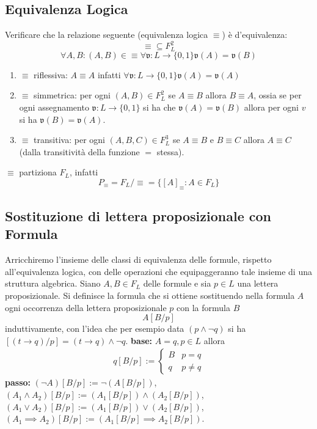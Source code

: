 \subsection{Equivalenza Logica}
Verificare che la relazione seguente (equivalenza logica $\equiv$) è d'equivalenza: 
$$ 
\equiv \subseteq F_L^2
$$
$$
\forall A,B: (A,B) \in \equiv \forall \mathfrak{v}:L\rightarrow \{0,1\} \mathfrak{v}(A) = \mathfrak{v}(B)
$$
\begin{enumerate}
  \item $\equiv$ riflessiva: $A \equiv A$ infatti $\forall \mathfrak{v}:L \rightarrow \{0,1\} \mathfrak{v}(A) = \mathfrak{v}(A)$
  \item $\equiv$ simmetrica: per ogni $(A,B) \in F_L^2$ se $A \equiv B$ allora
    $B \equiv A$, ossia se per ogni assegnamento $\mathfrak{v}:L \rightarrow \{0,1\}$ si 
    ha che $\mathfrak{v}(A) = \mathfrak{v}(B)$ allora per ogni $v$ si ha $\mathfrak{v}(B) = \mathfrak{v}(A)$. 
  \item $\equiv$ transitiva: per ogni $(A,B,C) \in F_L^3$ se $A \equiv B$ e 
    $B \equiv C$ allora $A \equiv C$ (dalla transitività della funzione 
    $=$ stessa). 
\end{enumerate}

$\equiv$ partiziona $F_L$, infatti 
$$
P_{\equiv} = F_L/\equiv =  \{ [A]_{\equiv} : A \in F_L\}
$$
\noindent 
\subsection{Sostituzione di lettera proposizionale con Formula}
Arricchiremo l'insieme delle classi di equivalenza delle formule, rispetto 
all'equivalenza logica, con delle operazioni che equipaggeranno tale insieme 
di una struttura algebrica.
Siano $A, B \in F_L$ delle formule e sia $p \in L$ una lettera proposizionale. 
Si definisce la formula che si ottiene sostituendo nella formula $A$ ogni 
occorrenza della lettera proposizionale $p$ con la formula $B$
$$
A[B/p]
$$
induttivamente, con l'idea che per esempio data $(p \land \neg q)$ si ha 
$[(t \rightarrow q)/p] = (t\rightarrow q) \land \neg q$. 
\newline
\textbf{base:} $A = q, p \in L$  allora 
\begin{align*}
  q[B/p] := 
  \begin{cases}
    B & p = q \\
    q & p \neq q 
  \end{cases}
\end{align*}
\newline
\textbf{passo:}  
$(\neg A)[B/p] := \neg(A[B/p])$, 
$(A_1 \land A_2)[B/p] := (A_1[B/p]) \land (A_2[B/p])$, 
$(A_1 \lor A_2)[B/p] := (A_1[B/p]) \lor (A_2[B/p])$, 
$(A_1 \implies A_2)[B/p] := (A_1[B/p] \implies A_2[B/p])$. 


